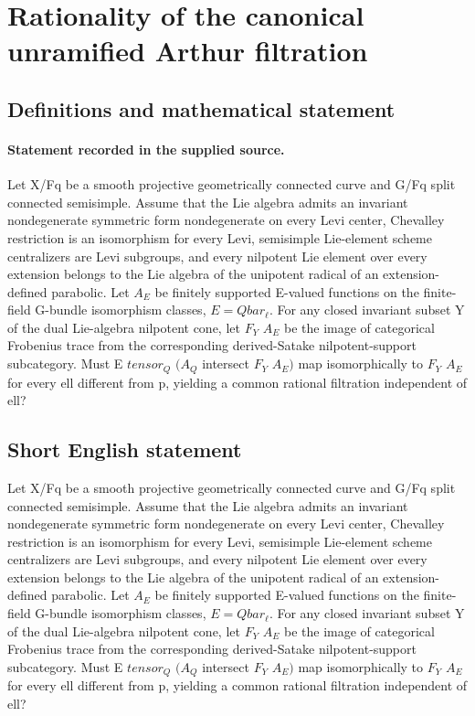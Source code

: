 \documentclass[11pt]{article}
\begin{document}
\section*{Rationality of the canonical unramified Arthur filtration}\label{30007280}
\subsection{Definitions and mathematical statement}
\paragraph{Statement recorded in the supplied source.}
Let X/Fq be a smooth projective geometrically connected curve and G/Fq split connected semisimple. Assume that the Lie algebra admits an invariant nondegenerate symmetric form nondegenerate on every Levi center, Chevalley restriction is an isomorphism for every Levi, semisimple Lie-element scheme centralizers are Levi subgroups, and every nilpotent Lie element over every extension belongs to the Lie algebra of the unipotent radical of an extension-defined parabolic. Let $A_E$ be finitely supported E-valued functions on the finite-field G-bundle isomorphism classes, $E=Qbar_\ell $. For any closed invariant subset Y of the dual Lie-algebra nilpotent cone, let $F_Y$ $A_E$ be the image of categorical Frobenius trace from the corresponding derived-Satake nilpotent-support subcategory. Must E $tensor_Q$ $(A_Q$ intersect $F_Y$ $A_E)$ map isomorphically to $F_Y$ $A_E$ for every ell different from p, yielding a common rational filtration independent of ell?
\subsection{Short English statement}
Let X/Fq be a smooth projective geometrically connected curve and G/Fq split connected semisimple. Assume that the Lie algebra admits an invariant nondegenerate symmetric form nondegenerate on every Levi center, Chevalley restriction is an isomorphism for every Levi, semisimple Lie-element scheme centralizers are Levi subgroups, and every nilpotent Lie element over every extension belongs to the Lie algebra of the unipotent radical of an extension-defined parabolic. Let $A_E$ be finitely supported E-valued functions on the finite-field G-bundle isomorphism classes, $E=Qbar_\ell $. For any closed invariant subset Y of the dual Lie-algebra nilpotent cone, let $F_Y$ $A_E$ be the image of categorical Frobenius trace from the corresponding derived-Satake nilpotent-support subcategory. Must E $tensor_Q$ $(A_Q$ intersect $F_Y$ $A_E)$ map isomorphically to $F_Y$ $A_E$ for every ell different from p, yielding a common rational filtration independent of ell?
\end{document}
